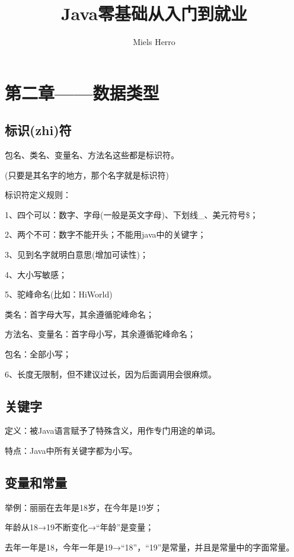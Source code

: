 \documentclass{article}
\title{Java零基础从入门到就业}
\author{Miels Herro}
\date{}
\begin{document}
\maketitle
{\centering\section*{第二章——数据类型}}

	\subsection{标识(zhi)符}
	
	包名、类名、变量名、方法名这些都是标识符。
	
	(只要是其名字的地方，那个名字就是标识符)
	
	标识符定义规则：
	
	\setlength{\parindent}{4em}1、四个可以：数字、字母(一般是英文字母)、下划线\_、美元符号\$；
	
	2、两个不可：数字不能开头；不能用java中的关键字；
	
	3、见到名字就明白意思(增加可读性)；
	
	4、大小写敏感；
	
	5、驼峰命名(比如：HiWorld)
	
	\setlength{\parindent}{7em}类名：首字母大写，其余遵循驼峰命名；
	
	方法名、变量名：首字母小写，其余遵循驼峰命名；
	
	包名：全部小写；
	
	\setlength{\parindent}{4em}
	6、长度无限制，但不建议过长，因为后面调用会很麻烦。
			
	\subsection{关键字}
		
	\setlength{\parindent}{2em}定义：被Java语言赋予了特殊含义，用作专门用途的单词。
	
	特点：Java中所有关键字都为小写。
	
	\subsection{变量和常量}
	
	举例：丽丽在去年是18岁，在今年是19岁；
	
	年龄从18→19不断变化→“年龄”是变量；
	
	去年一年是18，今年一年是19→“18”，“19”是常量，并且是常量中的字面常量。
	
\end{document}
